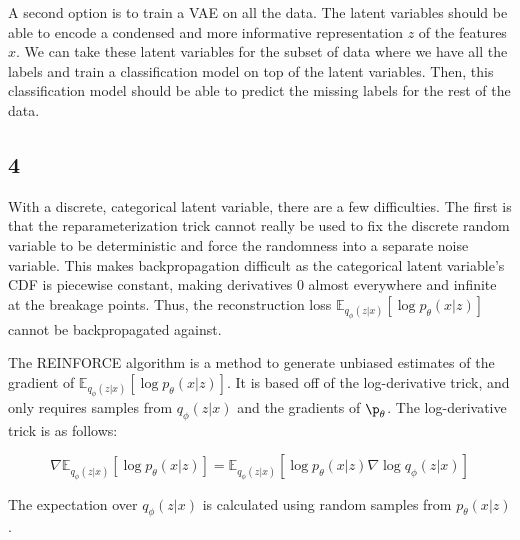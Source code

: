 \documentclass{article}
\begin{document}
A second option is to train a VAE on all the data. The latent variables should be able to encode a condensed and more informative representation $z$ of the features $x$. We can take these latent variables for the subset of data where we have all the labels and train a classification model on top of the latent variables. Then, this classification model should be able to predict the missing labels for the rest of the data.

\subsection{4}
With a discrete, categorical latent variable, there are a few difficulties. The first is that the reparameterization trick cannot really be used to fix the discrete random variable to be deterministic and force the randomness into a separate noise variable. This makes backpropagation difficult as the categorical latent variable's CDF is piecewise constant, making derivatives $0$ almost everywhere and infinite at the breakage points. Thus, the reconstruction loss $\mathbb{E}_{q_\phi(z|x)} [\log p_\theta (x|z)]$ cannot be backpropagated against.

The REINFORCE algorithm is a method to generate unbiased estimates of the gradient of $\mathbb{E}_{q_\phi(z|x)} [\log p_\theta (x|z)]$. It is based off of the log-derivative trick, and only requires samples from $q_\phi(z|x)$ and the gradients of $\p_\theta$. The log-derivative trick is as follows:

$$\nabla \mathbb{E}_{q_\phi(z|x)} [\log p_\theta (x|z)]
= \mathbb{E}_{q_\phi(z|x)}[\log p_\theta (x|z) \nabla \log q_\phi(z|x)]
$$

The expectation over $q_\phi(z|x)$ is calculated using random samples from $p_\theta(x|z)$.
\end{document}
